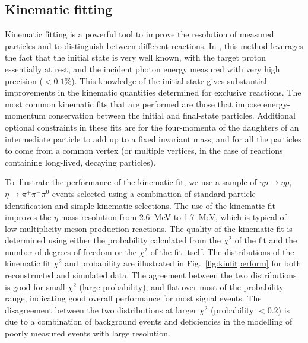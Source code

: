 \subsection{Kinematic fitting \label{sec:perffitting}}

Kinematic fitting is a powerful tool to improve the resolution of measured particles and to distinguish between different reactions.  In \gx{}, this method leverages the fact that the initial state is very well known, with the target proton essentially at rest, and the incident photon energy measured with very high precision ($<0.1\%$). This knowledge of the initial state gives substantial improvements in the kinematic quantities determined for exclusive reactions.  The most common kinematic fits that are performed are those that impose energy-momentum conservation between the initial and final-state particles.  Additional optional constraints in these fits are for the four-momenta of the daughters of an intermediate particle to add up to a fixed invariant mass, and for all the particles to come from a common vertex (or multiple vertices, in the case of reactions containing long-lived, decaying particles).

To illustrate the performance of the kinematic fit, we use a sample of $\gamma p \to \eta p$, $\eta \to \pi^+\pi^-\pi^0$ events selected using a combination of standard particle identification and simple kinematic selections.  
The use of the kinematic fit improves the $\eta$-mass resolution  from  2.6~MeV to 1.7~MeV, which is typical of low-multiplicity meson production reactions.  
The quality of the kinematic fit is determined using either the probability calculated from the $\chi^2$ of the fit and the number of degrees-of-freedom or the $\chi^2$ of the fit itself. 
The distributions of the kinematic fit $\chi^2$ and probability are illustrated in Fig.~\ref{fig:kinfitperform} for both reconstructed and simulated data.  The agreement between the two distributions is good for small $\chi^2$ (large probability), and flat over most of the probability range, indicating good overall performance for most signal events.  The disagreement between the two distributions at larger $\chi^2$ (probability $<0.2$) is due to a combination of background events and deficiencies in the modelling of poorly measured events with large resolution.

